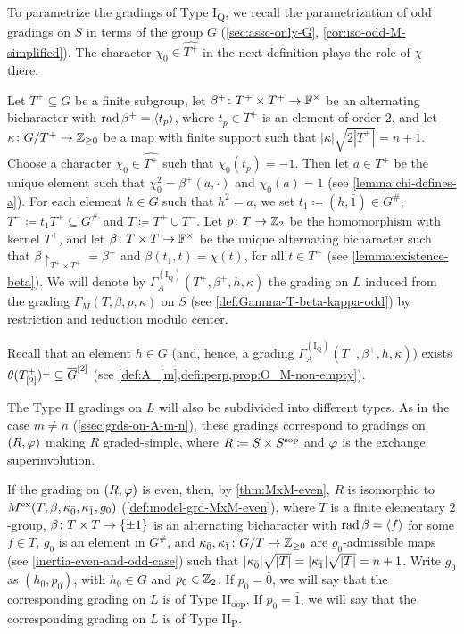 To parametrize the gradings of Type I\textsubscript{Q}, we recall the parametrization of odd gradings on $S$ in terms of the group $G$ (\cref{sec:assc-only-G}, \cref{cor:iso-odd-M-simplified}). 
The character $\chi_0 \in \widehat{T^+}$ in the next definition plays the role of $\chi$ there. 

\begin{defi}\label{def:Type-I_Q}
    Let $T^+ \subseteq G$ be a finite subgroup, let $\beta^+\colon T^+ \times T^+ \to \mathbb{F}^\times$ be an alternating bicharacter with $\operatorname{rad} \beta^+ = \langle t_p \rangle$, where $t_p\in T^+$ is an element of order $2$, and let $\kappa \colon G/T^+ \to \mathbb{Z}_{\geq 0}$ be a map with finite support such that $|\kappa| \sqrt{2|T^+|} = n+1$. 
    Choose a character $\chi_0 \in \widehat{T^+}$ such that $\chi_0 (t_p) = -1$. 
    Then let $a \in T^+$ be the unique element such that $\chi_0^2 = \beta^+(a, \cdot)$ and $\chi_0(a) = 1$ (see \cref{lemma:chi-defines-a}). 
    For each element $h \in G$ such that $h^2 = a$, we set $t_1 \coloneqq (h, \bar 1) \in G^\#$, $T^- \coloneqq t_1 T^+ \subseteq G^\#$ and $T \coloneqq T^+ \cup T^-$. 
    Let $p\colon T \to \mathbb{Z}_2$ be the homomorphism with kernel $T^+$, and let $\beta\colon T \times T \to \mathbb{F}^\times$ be the unique alternating bicharacter such that $\beta\restriction_{T^+ \times T^+} = \beta^+$ and $\beta(t_1, t) = \chi(t)$, for all $t\in T^+$ (see \cref{lemma:existence-beta}). 
    We will denote by  $\Gamma^{\mathrm{(I_Q)}}_A(T^+, \beta^+, h, \kappa)$ the grading on $L$ induced from the grading $\Gamma_M(T, \beta, p, \kappa)$ on $S$ (see \cref{def:Gamma-T-beta-kappa-odd}) by restriction and reduction modulo center. 
\end{defi}

Recall that an element $h \in G$ (and, hence, a grading $\Gamma^{\mathrm{(I_Q)}}_A(T^+, \beta^+, h, \kappa)$) exists \IFF $\theta(T^+_{[2]})^\perp \subseteq \barr G^{[2]}$ (see \cref{def:A_[m],defi:perp,prop:O_M-non-empty}).

The Type II gradings on $L$ will also be subdivided into different types. 
As in the case $m\neq n$ (\cref{ssec:grds-on-A-m-n}), these gradings correspond to gradings on $(R, \varphi)$ making $R$ graded-simple, where $R \coloneqq S \times S^{\mathrm{sop}}$ and $\varphi$ is the exchange superinvolution. 

If the grading on $(R,\varphi)$ is even, then, by \cref{thm:MxM-even}, $R$ is isomorphic to $M^{\mathrm{ex}} (T, \beta, \kappa_{\bar{0}}, \kappa_{\bar{1}}, g_0)$ (\cref{def:model-grd-MxM-even}), where $T$ is a finite elementary $2$-group, $\beta\colon T\times T \to \{ \pm 1 \}$ is an alternating bicharacter with $\operatorname{rad} \beta = \langle f \rangle$ for some $f \in T$, $g_0$ is an element in $G^\#$, and $\kappa_{\bar{0}}, \kappa_{\bar{1}} \colon G/T \to \mathbb{Z}_{\geq 0}$ are $g_0$-admissible maps (see \cref{inertia-even-and-odd-case}) such that $|\kappa_{\bar{0}}| \sqrt{|T|} = |\kappa_{\bar{1}}| \sqrt{|T|} = n+1$. 
Write $g_0$ as $(h_0, p_0)$, with $h_0 \in G$ and $p_0 \in \mathbb{Z}_2$. 
If $p_0 = \bar 0$, we will say that the corresponding grading on $L$ is of Type II\textsubscript{osp}. 
If $p_0 = \bar 1$, we will say that the corresponding grading on $L$ is of Type II\textsubscript{P}. 

